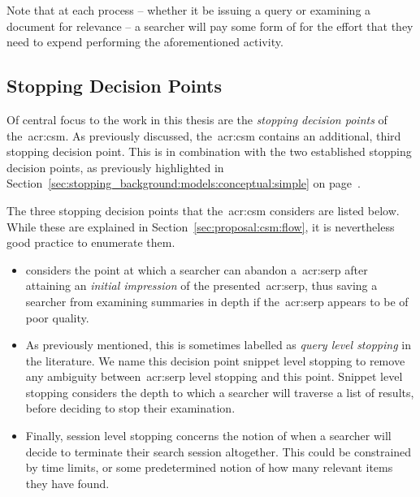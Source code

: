 Note that at each process -- whether it be issuing a query or examining a document for relevance -- a searcher will pay some form of  for the effort that they need to expend performing the aforementioned activity.

%
%
%
%
%

\subsection{Stopping Decision Points}\label{sec:proposal:model:stopping_points}
Of central focus to the work in this thesis are the \emph{stopping decision points} of the~\gls{acr:csm}. As previously discussed, the~\gls{acr:csm} contains an additional, third stopping decision point. This is in combination with the two established stopping decision points, as previously highlighted in Section~\ref{sec:stopping_background:models:conceptual:simple} on page~\pageref{sec:stopping_background:models:conceptual:simple}.

The three stopping decision points that the~\gls{acr:csm} considers are listed below. While these are explained in Section~\ref{sec:proposal:csm:flow}, it is nevertheless good practice to enumerate them.

\begin{itemize}
    
    \item{ considers the point at which a searcher can abandon a~\gls{acr:serp} after attaining an \emph{initial impression} of the presented~\gls{acr:serp}, thus saving a searcher from examining summaries in depth if the~\gls{acr:serp} appears to be of poor quality.}
    
    \item{ As previously mentioned, this is sometimes labelled as \emph{query level stopping} in the literature. We name this decision point snippet level stopping to remove any ambiguity between~\gls{acr:serp} level stopping and this point. Snippet level stopping considers the depth to which a searcher will traverse a list of results, before deciding to stop their examination.}
    
    \item{ Finally, session level stopping concerns the notion of when a searcher will decide to terminate their search session altogether. This could be constrained by time limits, or some predetermined notion of how many relevant items they have found.}
    
\end{itemize}

